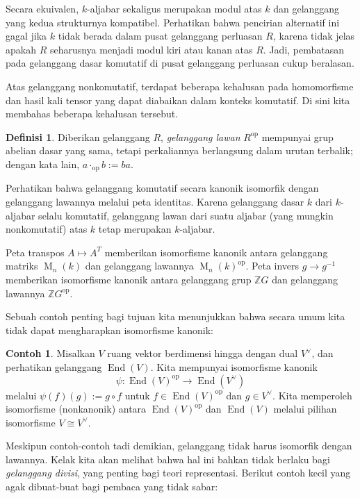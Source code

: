 \documentclass[12pt]{article}
\theoremstyle{plain}
\theoremstyle{definition}
\newtheorem{definition}[theorem]{Definisi}
\newtheorem{example}[theorem]{Contoh}
\theoremstyle{remark}
\numberwithin{equation}{section}
\begin{document}
Secara ekuivalen, $k$-aljabar sekaligus merupakan modul atas $k$ dan gelanggang
yang kedua strukturnya kompatibel.
Perhatikan bahwa pencirian alternatif ini gagal jika $k$ tidak berada
dalam pusat gelanggang perluasan $R$, karena tidak jelas apakah
$R$ seharusnya menjadi modul kiri atau kanan atas $R$.
Jadi, pembatasan pada gelanggang dasar komutatif di pusat
gelanggang perluasan cukup beralasan.

Atas gelanggang nonkomutatif, terdapat beberapa kehalusan pada homomorfisme
dan hasil kali tensor yang dapat diabaikan dalam konteks komutatif.
Di sini kita membahas beberapa kehalusan tersebut.

\begin{definition}
Diberikan gelanggang $R$, \emph{gelanggang lawan} $R^{\mathrm{op}}$ mempunyai
grup abelian dasar yang sama, tetapi perkaliannya berlangsung dalam
urutan terbalik; dengan kata lain, $a \cdot_{\mathrm{op}} b := ba$.
\end{definition}

Perhatikan bahwa gelanggang komutatif secara kanonik isomorfik dengan
gelanggang lawannya melalui peta identitas.
Karena gelanggang dasar $k$ dari $k$-aljabar selalu komutatif,
gelanggang lawan dari suatu aljabar (yang mungkin nonkomutatif)
atas $k$ tetap merupakan $k$-aljabar.

Peta transpos $A \mapsto A^T$ memberikan isomorfisme kanonik
antara gelanggang matriks $\operatorname{M}_n(k)$ dan gelanggang lawannya
$\operatorname{M}_n(k)^{\mathrm{op}}$.
Peta invers $g \to g^{-1}$ memberikan isomorfisme kanonik
antara gelanggang grup $\mathbb{Z}G$ dan gelanggang lawannya
$\mathbb{Z}G^{\mathrm{op}}$.

Sebuah contoh penting bagi tujuan kita menunjukkan bahwa secara umum
kita tidak dapat mengharapkan isomorfisme kanonik:

\begin{example}
Misalkan $V$ ruang vektor berdimensi hingga dengan dual $V^\vee$,
dan perhatikan gelanggang $\operatorname{End}(V)$.
Kita mempunyai isomorfisme kanonik
\[
\psi : \operatorname{End}(V)^{\mathrm{op}} \to \operatorname{End}(V^\vee)
\]
melalui $\psi(f)(g):=g \circ f$ untuk $f \in
\operatorname{End}(V)^{\mathrm{op}}$ dan $g \in V^\vee$.
Kita memperoleh isomorfisme (nonkanonik) antara
$\operatorname{End}(V)^{\mathrm{op}}$ dan $\operatorname{End}(V)$
melalui pilihan isomorfisme $V \cong V^\vee$.
\end{example}

Meskipun contoh-contoh tadi demikian, gelanggang tidak harus isomorfik dengan lawannya.
Kelak kita akan melihat bahwa hal ini bahkan tidak berlaku bagi \emph{gelanggang
divisi}, yang penting bagi teori representasi.
Berikut contoh kecil yang agak dibuat-buat bagi pembaca yang tidak sabar: 
\end{document}
